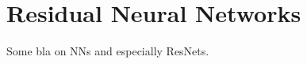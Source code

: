 \section{Residual Neural Networks}
\label{sec:neural-networks}

Some bla on NNs and especially ResNets.